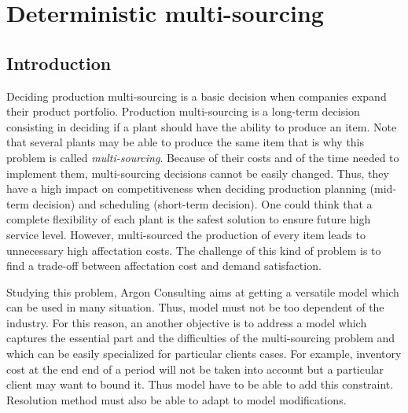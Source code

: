 \chapter{Deterministic multi-sourcing}
\label{chap:multi-sourcing:deterministic}

\section{Introduction}



Deciding production multi-sourcing is a basic decision when companies expand their product portfolio.
Production multi-sourcing is a long-term decision consisting in deciding if a plant should have the ability to produce an item.
Note that several plants may be able to produce the same item that is why this problem is called \emph{multi-sourcing}.
Because of their costs and of the time needed to implement them, multi-sourcing decisions cannot be easily changed.
Thus, they have a high impact on competitiveness when deciding production planning (mid-term decision) and scheduling (short-term decision).
One could think that a complete flexibility of each plant is the safest solution to ensure future high service level.
However, multi-sourced the production of every item leads to unnecessary high affectation costs.
The challenge of this kind of problem is to find a trade-off between affectation cost and demand satisfaction.


Studying this problem, Argon Consulting aims at getting a versatile model which can be used in many situation.
Thus, model must not be too dependent of the industry.
For this reason, an another objective is to address a model which captures the essential part and the difficulties of the multi-sourcing problem and which can be easily specialized for particular clients cases.
For example, inventory cost at the end end of a period will not be taken into account but a particular client may want to bound it.
Thus model have to be able to add this constraint.
Resolution method must also be able to adapt to model modifications.


